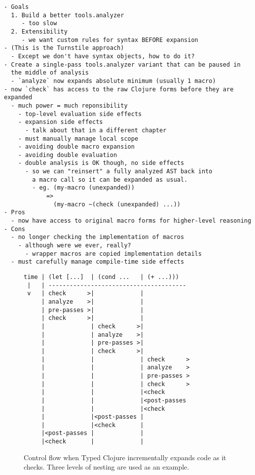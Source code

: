 {
\singlespacing
\begin{verbatim}
- Goals
  1. Build a better tools.analyzer
     - too slow
  2. Extensibility
     - we want custom rules for syntax BEFORE expansion
- (This is the Turnstile approach)
  - Except we don't have syntax objects, how to do it?
- Create a single-pass tools.analyzer variant that can be paused in
  the middle of analysis
  - `analyze` now expands absolute minimum (usually 1 macro)
- now `check` has access to the raw Clojure forms before they are expanded
  - much power = much reponsibility
    - top-level evaluation side effects
    - expansion side effects
      - talk about that in a different chapter
    - must manually manage local scope
    - avoiding double macro expansion
    - avoiding double evaluation
    - double analysis is OK though, no side effects
      - so we can "reinsert" a fully analyzed AST back into
        a macro call so it can be expanded as usual.
        - eg. (my-macro (unexpanded))
            =>
              (my-macro ~(check (unexpanded) ...))
- Pros
  - now have access to original macro forms for higher-level reasoning
- Cons
  - no longer checking the implementation of macros
    - although were we ever, really?
      - wrapper macros are copied implementation details
  - must carefully manage compile-time side effects
\end{verbatim}
}

\begin{figure*}
\singlespacing
\begin{verbatim}
time | (let [...]  | (cond ...   | (+ ...)))
 |   | ---------------------------------------
 v   | check      >|             |
     | analyze    >|             |
     | pre-passes >|             |
     | check      >|             |
     |             | check      >|
     |             | analyze    >|
     |             | pre-passes >|
     |             | check      >|
     |             |             | check      >
     |             |             | analyze    >
     |             |             | pre-passes >
     |             |             | check      >
     |             |             |<check
     |             |             |<post-passes
     |             |             |<check
     |             |<post-passes |
     |             |<check       |
     |<post-passes |             |
     |<check       |             |
\end{verbatim}
  \caption{Control flow when Typed Clojure incrementally expands code as it checks.
  Three levels of nesting are used as an example.
  }
\end{figure*}


